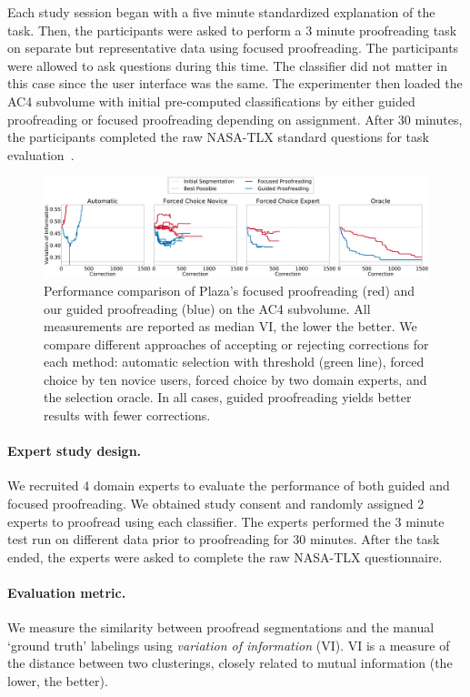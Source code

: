 Each study session began with a five minute standardized explanation of the task. Then, the participants were asked to perform a 3 minute proofreading task on separate but representative data using focused proofreading. The participants were allowed to ask questions during this time. The classifier did not matter in this case since the user interface was the same. The experimenter then loaded the AC4 subvolume with initial pre-computed classifications by either guided proofreading or focused proofreading depending on assignment. After 30 minutes, the participants completed the raw NASA-TLX standard questions for task evaluation~\cite{NASATLX}.
\begin{figure}[t]
\centering
\includegraphics[width=\linewidth]{gfx/ac4trails_combined.pdf}
\caption{Performance comparison of Plaza's focused proofreading (red) and our guided proofreading (blue) on the AC4 subvolume. All measurements are reported as median VI, the lower the better. We compare different approaches of accepting or rejecting corrections for each method: automatic selection with threshold (green line), forced choice by ten novice users, forced choice by two domain experts, and the selection oracle. In all cases, guided proofreading yields better results with fewer corrections.}
\label{fig:ac4trails}
\end{figure}

\paragraph{Expert study design.} We recruited 4 domain experts to evaluate the performance of both guided and focused proofreading. We obtained study consent and randomly assigned 2 experts to proofread using each classifier. The experts performed the 3 minute test run on different data prior to proofreading for 30 minutes. After the task ended, the experts were asked to complete the raw NASA-TLX questionnaire.

\paragraph{Evaluation metric.} We measure the similarity between proofread segmentations and the manual `ground truth' labelings using \textit{variation of information} (VI). VI is a measure of the distance between two clusterings, closely related to mutual information (the lower, the better).%

